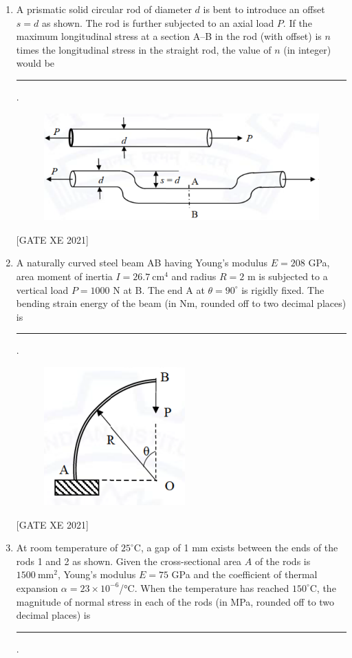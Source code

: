 \documentclass[journal,12pt,onecolumn]{IEEEtran}
\theoremstyle{remark}
\begin{document}
\begin{enumerate}[resume]
\hfill[GATE XE 2021]


\item A prismatic solid circular rod of diameter $d$ is bent to introduce an offset $s=d$ as shown. The rod is further subjected to an axial load $P$. If the maximum longitudinal stress at a section A–B in the rod (with offset) is $n$ times the longitudinal stress in the straight rod, the value of $n$ (in integer) would be \rule{3cm}{0.15mm}.

\begin{figure}[H]
      \centering
      \includegraphics[width=0.5\columnwidth]{figs/fig27.png}
      \caption{}
      \label{fig:placeholder}
  \end{figure}

\hfill[GATE XE 2021]


\item A naturally curved steel beam AB having Young’s modulus $E = 208$ GPa, area moment of inertia $I = 26.7\ \text{cm}^4$ and radius $R = 2$ m is subjected to a vertical load $P = 1000$ N at B. The end A at $\theta = 90^\circ$ is rigidly fixed. The bending strain energy of the beam (in Nm, rounded off to two decimal places) is \rule{3cm}{0.15mm}.

\begin{figure}[H]
      \centering
      \includegraphics[width=0.4\columnwidth]{figs/fig28.png}
      \caption{}
      \label{fig:placeholder}
  \end{figure}

\hfill[GATE XE 2021]


\item At room temperature of $25^\circ$C, a gap of 1 mm exists between the ends of the rods 1 and 2 as shown. Given the cross-sectional area $A$ of the rods is $1500\ \text{mm}^2$, Young’s modulus $E = 75$ GPa and the coefficient of thermal expansion $\alpha = 23 \times 10^{-6}$/°C. When the temperature has reached $150^\circ$C, the magnitude of normal stress in each of the rods (in MPa, rounded off to two decimal places) is \rule{3cm}{0.15mm}.


\end{enumerate}
\end{document}
